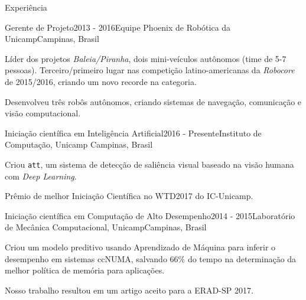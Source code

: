 \documentclass[8pt]{resume}
\newcommand{\tit}[1]{\textit{#1}}
\newcommand{\ttt}[1]{\texttt{#1}}
\begin{document}
\begin{rSection}{Experiência}

\begin{rSubsection}{Gerente de Projeto}{2013 - 2016}{Equipe Phoenix de Robótica da Unicamp}{Campinas, Brasil}
    \item Líder dos projetos \tit{Baleia/Piranha}, dois mini-veículos
        autônomos (time de 5-7 pessoas).
        Terceiro/primeiro lugar nas competição latino-americanas da
        \tit{Robocore} de 2015/2016, criando um novo recorde na categoria.
    \item Desenvolveu três robôs autônomos, criando sistemas de
        navegação, comunicação e visão computacional.
\end{rSubsection}

\begin{rSubsection}{Iniciação científica em Inteligência Artificial}{2016 - Presente}{Instituto de Computação, Unicamp}
    {Campinas, Brasil}
    \item Criou \ttt{att}, um sistema de detecção de saliência visual
        baseado na visão humana com \tit{Deep Learning}.
    \item Prêmio de melhor Iniciação Científica no WTD2017 do IC-Unicamp.
\end{rSubsection}

\begin{rSubsection}{Iniciação científica em Computação de Alto Desempenho}{2014 - 2015}{Laboratório de Mecânica Computacional, Unicamp}{Campinas, Brasil}
    \item Criou um modelo preditivo usando Aprendizado de Máquina para inferir
        o desempenho em sistemas ccNUMA,
        salvando $66\%$ do tempo na determinação da melhor política de
        memória para aplicações.
    \item Nosso trabalho resultou em um artigo aceito para a ERAD-SP 2017.
\end{rSubsection}


\end{rSection}
\end{document}
